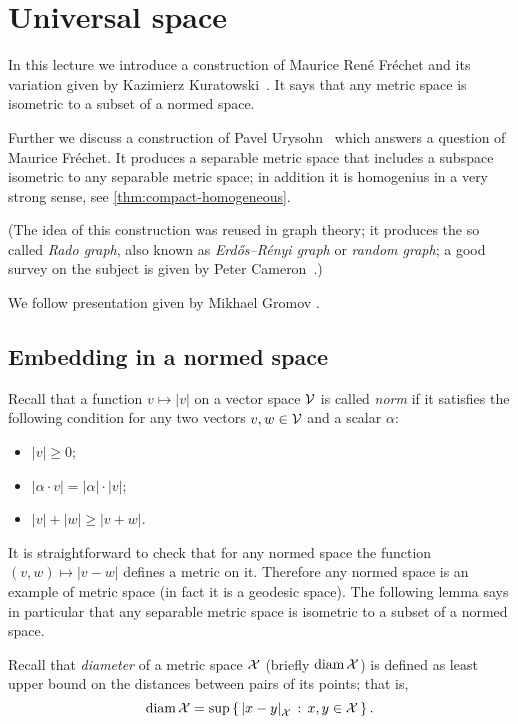 \chapter{Universal space}

In this lecture we introduce a construction of Maurice René Fréchet \cite{frechet} and its variation given by Kazimierz Kuratowski~\cite{kuratowski}.
It says that any metric space is isometric to a subset of a normed space.

Further we discuss a construction of Pavel Urysohn~\cite{urysohn} which answers a question of Maurice Fréchet.
It produces a separable metric space that includes a subspace  isometric to any separable metric space; in addition it is homogenius in a very strong sense, see \ref{thm:compact-homogeneous}.

(The idea of this construction was reused in graph theory; it produces the so called {}\emph{Rado graph},
also known as {}\emph{Erd\H{o}s–R\'enyi graph} or \emph{random graph}; a good survey on the subject is given by Peter Cameron~\cite{cameron}.)

We follow presentation given by Mikhael Gromov \cite{gromov-2007}.

\section{Embedding in a normed space}

Recall that a function $v\mapsto |v|$ on a vector space $\mathcal{V}$ is called \emph{norm} if it satisfies the following condition for any two vectors $v,w\in \mathcal{V}$ and a scalar $\alpha$:
\begin{itemize}
\item $|v|\ge 0$;
\item $|\alpha\cdot v|=|\alpha|\cdot |v|$;
\item $|v|+|w|\ge|v+w|$.
\end{itemize}

It is straightforward to check that for any normed space the function $(v,w)\mapsto |v-w|$ defines a metric on it.
Therefore any normed space is an example of metric space (in fact it is a geodesic space).
The following lemma says in particular that any separable metric space is isometric to a subset of a normed space.

Recall that \emph{diameter} of a metric space $\mathcal{X}$ (briefly $\operatorname{\rm diam}\nolimits \mathcal{X}$) is defined as least upper bound on the distances between pairs of its points;
that is,
\[\diam \spc{X}=\sup\set{\dist{x}{y}{\spc{X}}}{x,y\in \spc{X}}.\]

